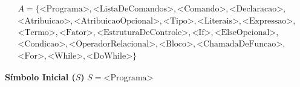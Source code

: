 \documentclass[12pt,a4paper]{article}
\begin{document}
\begin{multline*}
A = \{ \text{<Programa>}, \text{<ListaDeComandos>}, \text{<Comando>}, \text{<Declaracao>}, \\
\text{<Atribuicao>}, \text{<AtribuicaoOpcional>}, \text{<Tipo>}, \text{<Literais>}, \text{<Expressao>}, \\
\text{<Termo>}, \text{<Fator>}, \text{<EstruturaDeControle>}, \text{<If>}, \text{<ElseOpcional>}, \\
\text{<Condicao>}, \text{<OperadorRelacional>}, \text{<Bloco>}, \text{<ChamadaDeFuncao>}, \\
\text{<For>}, \text{<While>}, \text{<DoWhile>} \}
\end{multline*}

\textbf{Símbolo Inicial ($S$)}
\vspace{1em}
$S = \text{<Programa>}$
\end{document}

